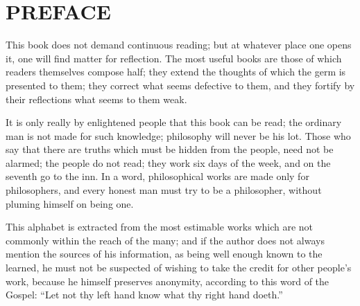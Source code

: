 \chapter*{PREFACE}
 \setcounter{page}{1}
This book does not demand continuous reading; but at whatever place one
opens it, one will find matter for reflection. The most useful books are
those of which readers themselves compose half; they extend the thoughts
of which the germ is presented to them; they correct what seems
defective to them, and they fortify by their reflections what seems to
them weak.

It is only really by enlightened people that this book can be read; the
ordinary man is not made for such knowledge; philosophy will never be
his lot. Those who say that there are truths which must be hidden from
the people, need not be alarmed; the people do not read; they work six
days of the week, and on the seventh go to the inn. In a word,
philosophical works are made only for philosophers, and every honest man
must try to be a philosopher, without pluming himself on being one.

This alphabet is extracted from the most estimable works which are not
commonly within the reach of the many; and if the author does not always
mention the sources of his information, as being well enough known to
the learned, he must not be suspected of wishing to take the credit for
other people's work, because he himself preserves anonymity, according
to this word of the Gospel: \enquote{Let not thy left hand know what thy right hand doeth.}

